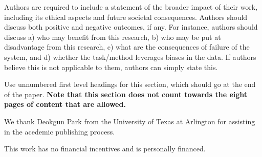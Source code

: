 \documentclass{article}
\begin{document}
Authors are required to include a statement of the broader impact of their work, including its ethical aspects and future societal consequences. 
Authors should discuss both positive and negative outcomes, if any. For instance, authors should discuss a) 
who may benefit from this research, b) who may be put at disadvantage from this research, c) what are the consequences of failure of the system, and d) whether the task/method leverages
biases in the data. If authors believe this is not applicable to them, authors can simply state this.

Use unnumbered first level headings for this section, which should go at the end of the paper. {\bf Note that this section does not count towards the eight pages of content that are allowed.}

\begin{ack}
We thank Deokgun Park from the University of Texas at Arlington for assisting in the acedemic publishing process. \citep[p. 130]{Ful83}

This work has no financial incentives and is personally financed.
\end{ack}

\medskip



\end{document}
